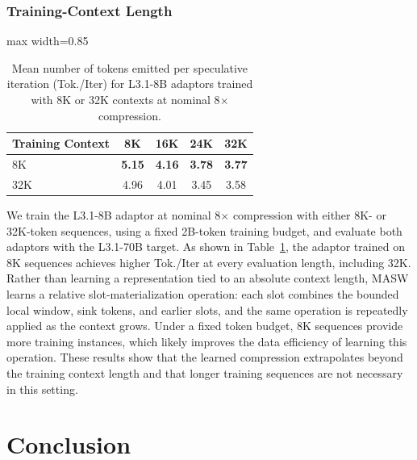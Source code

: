 \subsubsection{Training-Context Length}

\begin{table}[h]
    \centering
    \begin{adjustbox}{max width=0.85\linewidth}
    \begin{tabular}{@{}lcccc@{}}
        \toprule
        \textbf{Training Context} & \textbf{8K} & \textbf{16K} & \textbf{24K} & \textbf{32K} \\
        \midrule
        8K  & \textbf{5.15} & \textbf{4.16} & \textbf{3.78} & \textbf{3.77} \\
        32K & 4.96 & 4.01 & 3.45 & 3.58 \\
        \bottomrule
    \end{tabular}
    \end{adjustbox}
    \caption{Mean number of tokens emitted per speculative iteration (Tok./Iter) for L3.1-8B adaptors trained with 8K or 32K contexts at nominal 8$\times$ compression.}
    \label{tab:training_context_length}
\end{table}

We train the L3.1-8B adaptor at nominal 8$\times$ compression with either 8K- or 32K-token sequences, using a fixed 2B-token training budget, and evaluate both adaptors with the L3.1-70B target.
As shown in Table~\ref{tab:training_context_length}, the adaptor trained on 8K sequences achieves higher Tok./Iter at every evaluation length, including 32K.
Rather than learning a representation tied to an absolute context length, MASW learns a relative slot-materialization operation: each slot combines the bounded local window, sink tokens, and earlier slots, and the same operation is repeatedly applied as the context grows.
Under a fixed token budget, 8K sequences provide more training instances, which likely improves the data efficiency of learning this operation.
These results show that the learned compression extrapolates beyond the training context length and that longer training sequences are not necessary in this setting.

\section{Conclusion}

